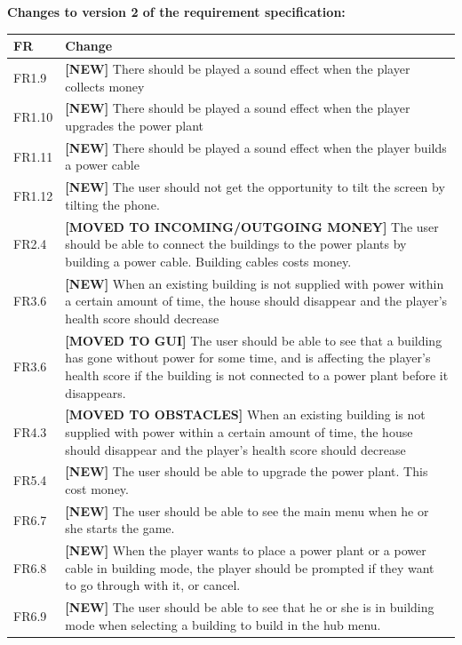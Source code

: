 	{\bf Changes to version 2 of the requirement specification:} \\
	\begin{tabular}{| p{1.5cm} | p{12cm} |}
		\hline
		\rowcolor{lightgray}
		{\bf FR} & {\bf Change} \\ \hline
		FR1.9 & {\bf \color{green} [NEW]} There should be played a sound effect when 
		the player collects money \\ \hline
		FR1.10 & {\bf \color{green} [NEW]} There should be played a sound effect when 
		the player upgrades the power plant \\ \hline
		FR1.11 & {\bf \color{green} [NEW]} There should be played a sound effect when 
		the player builds a power cable \\ \hline
		FR1.12 & {\bf \color{green} [NEW]} The user should not get the opportunity to 
		tilt the screen by tilting the phone. \\ \hline
		FR2.4 & {\bf \color{orange} [MOVED TO INCOMING/OUTGOING MONEY]} The user should 
		be able to connect the buildings to the power plants by building a power cable. 
		Building cables costs money. \\ \hline
		FR3.6 & {\bf \color{green} [NEW]} When an existing building is not supplied 
		with power within a certain amount of time, the house should disappear and the player's 
		health score should decrease \\ \hline
		FR3.6 & {\bf \color{orange} [MOVED TO GUI]} The user should be able to see 
		that a building has gone without power for some time, and is affecting the 
		player's health score if the building is not connected to a power plant before it 
		disappears. \\ \hline
		FR4.3 & {\bf \color{orange} [MOVED TO OBSTACLES]} When an existing building 
		is not supplied with power within a certain amount of time, the house should 
		disappear and the player's health score should decrease \\ \hline
		FR5.4 & {\bf \color{green} [NEW]} The user should be able to upgrade the power plant. 
		This cost money. \\ \hline
		FR6.7 & {\bf \color{green} [NEW]} The user should be able to see the main 
		menu when he or she starts the game. \\ \hline
		FR6.8 & {\bf \color{green} [NEW]} When the player wants to place a power plant 
		or a power cable in building mode, the player should be prompted if they want to 
		go through with it, or cancel. \\ \hline
		FR6.9 & {\bf \color{green} [NEW]} The user should be able to see that he or she 
		is in building mode when selecting a building to build in the hub menu. \\ \hline
	\end{tabular}

